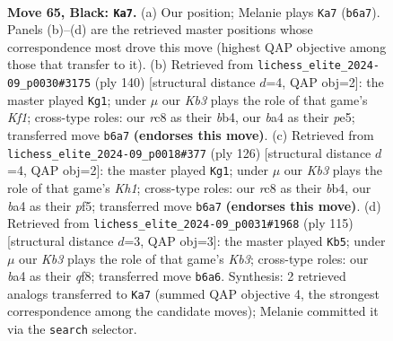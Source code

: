 \documentclass[11pt]{article}
\begin{document}
\clearpage

\begin{figure}[p]\centering
\begin{subfigure}{0.46\textwidth}\centering
\resizebox{\linewidth}{!}{%
\newchessgame
\chessboard[
  setfen={2R5/8/1k6/5p2/B4P2/4K3/7P/8 b - - 2 65},
  showmover=false,
  pgfstyle=straightmove, color=movearrow, markmove={b6-a7}
]}
\caption{}
\end{subfigure}\hfill
\begin{subfigure}{0.46\textwidth}\centering
\resizebox{\linewidth}{!}{%
\newchessgame
\chessboard[
  setfen={8/8/8/4p3/Pb6/5kp1/8/5K2 w - - 0 71},
  showmover=false,
  pgfstyle=straightmove, color=movearrow, markmove={f1-g1}
]}
\caption{}
\end{subfigure}
\\[4pt]
\begin{subfigure}{0.46\textwidth}\centering
\resizebox{\linewidth}{!}{%
\newchessgame
\chessboard[
  setfen={8/p7/8/5p2/1b6/1P4kp/8/7K w - - 2 64},
  showmover=false,
  pgfstyle=straightmove, color=movearrow, markmove={h1-g1}
]}
\caption{}
\end{subfigure}\hfill
\begin{subfigure}{0.46\textwidth}\centering
\resizebox{\linewidth}{!}{%
\newchessgame
\chessboard[
  setfen={5Q2/3R4/1k6/8/8/7p/P6P/7K b - - 2 58},
  showmover=false,
  pgfstyle=straightmove, color=movearrow, markmove={b6-b5}
]}
\caption{}
\end{subfigure}
\caption{\textbf{Move 65, Black: \texttt{Ka7}.} (a) Our position; Melanie plays \texttt{Ka7} (\texttt{b6a7}). Panels (b)--(d) are the retrieved master positions whose correspondence most drove this move (highest QAP objective among those that transfer to it). (b) Retrieved from \texttt{lichess\_elite\_2024-09\_p0030\#3175} (ply 140) [structural distance $d$=4, QAP obj=2]: the master played \texttt{Kg1}; under $\mu$ our \emph{Kb3} plays the role of that game's \emph{Kf1}; cross-type roles: our \emph{r}c8 as their \emph{b}b4, our \emph{b}a4 as their \emph{p}e5; transferred move \texttt{b6a7} \textbf{(endorses this move)}. (c) Retrieved from \texttt{lichess\_elite\_2024-09\_p0018\#377} (ply 126) [structural distance $d$=4, QAP obj=2]: the master played \texttt{Kg1}; under $\mu$ our \emph{Kb3} plays the role of that game's \emph{Kh1}; cross-type roles: our \emph{r}c8 as their \emph{b}b4, our \emph{b}a4 as their \emph{p}f5; transferred move \texttt{b6a7} \textbf{(endorses this move)}. (d) Retrieved from \texttt{lichess\_elite\_2024-09\_p0031\#1968} (ply 115) [structural distance $d$=3, QAP obj=3]: the master played \texttt{Kb5}; under $\mu$ our \emph{Kb3} plays the role of that game's \emph{Kb3}; cross-type roles: our \emph{b}a4 as their \emph{q}f8; transferred move \texttt{b6a6}. Synthesis: 2 retrieved analogs transferred to \texttt{Ka7} (summed QAP objective 4, the strongest correspondence among the candidate moves); Melanie committed it via the \texttt{search} selector.}
\label{fig:thought-m129}
\end{figure}
\end{document}

